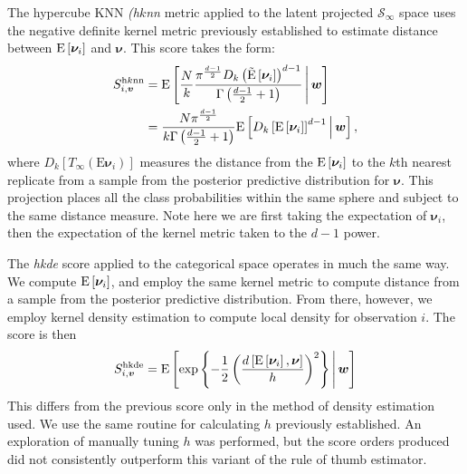 The hypercube KNN \emph{(h$k$nn} metric applied to the latent projected 
    $\mathcal{S}_{\infty}$ space uses the negative definite kernel metric 
    previously established to estimate distance between $\text{E}\left[\bm{\nu}_i\right]$ 
    and $\bm{\nu}$.  This score takes the form:
    \begin{equation}
      \label{score:cat_hknn}
      \begin{aligned}
      S_{i,\bm{v}}^{\text{h$k$nn}} &= \text{E}\left[\frac{N}{k}
        \frac{\pi^{\frac{d-1}{2}}D_{k}
        \left(\tilde{\text{E}}\left[\bm{\nu}_i\right]\right)^{d-1}}{
          \Gamma\left(\frac{d-1}{2} + 1\right)}
      \,\middle\vert\,\bm{w}\right]\\
      &= \frac{N\pi^{\frac{d-1}{2}}}{k\Gamma\left(\frac{d-1}{2} + 1\right)}
      \text{E}\left[D_{k}\left[\text{E}\left[\bm{\nu}_i\right]\right]^{d-1}\,\middle\vert\,\bm{w}\right],
      \end{aligned}
    \end{equation}
    where $D_{k}\left[T_{\infty}(\text{E}\bm{\nu}_i)\right]$ measures the 
    distance from the  $\text{E}\left[\bm{\nu}_i\right]$ to the $k$th nearest replicate from 
    a sample from the posterior predictive distribution for $\bm{\nu}$.  This 
    projection places all the class probabilities within the same sphere and 
    subject to the same distance measure.  Note here we are first taking the 
    expectation of $\bm{\nu}_i$, then the expectation of the kernel metric taken 
    to the $d-1$ power.

The \emph{hkde} score applied to the categorical space operates in much the 
    same way.  We compute $\text{E}\left[\bm{\nu}_i\right]$, and employ the same kernel 
    metric to compute distance from a sample from the posterior predictive 
    distribution.  From there, however, we employ kernel density estimation
    to compute local density for observation $i$.  The score is then
    \begin{equation}
        \label{score:cat_hkde}
        S_{i,\bm{v}}^{\text{hkde}} = \text{E}\left[
            \exp\left\lbrace
            -\frac{1}{2}\left(
            \frac{d\left[\text{E}\left[\bm{\nu}_i\right], \bm{\nu}\right]}{h}
            \right)^2
            \right\rbrace 
        \,\middle\vert\, \bm{w}\right]
    \end{equation}
This differs from the previous score only in the method of density estimation 
    used.  We use the same routine for calculating $h$ previously established.  
    An exploration of manually tuning $h$ was performed, but the score orders 
    produced did not consistently outperform this variant of the rule of thumb 
    estimator.

